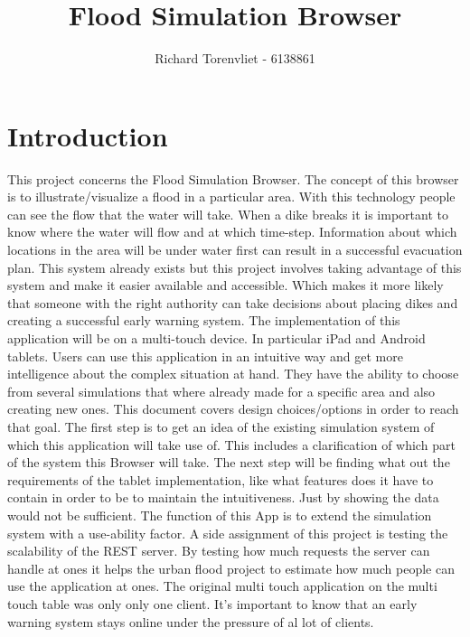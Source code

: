 \documentclass[10pt,a4paper]{article}
\author{Richard Torenvliet - 6138861}
\title{Flood Simulation Browser}
\begin{document}
\maketitle
\section{Introduction}
This project concerns the Flood Simulation Browser. The concept of this browser is to illustrate/visualize a flood in a particular area. With this technology people can see the flow that the water will take. When a dike breaks it is important to know where the water will flow and at which time-step. Information about which locations in the area will be under water first can result in a successful evacuation plan. This system already exists but this project involves taking advantage of this system and make it easier available and accessible. Which makes it more likely that someone with the right authority can take decisions about placing dikes and creating a successful early warning system.
The implementation of this application will be on a multi-touch device. In particular iPad and Android tablets. Users can use this application in an intuitive way and get more intelligence about the complex situation at hand. They have the ability to choose from several simulations that where already made for a specific area and also creating new ones.
This document covers design choices/options in order to reach that goal. The first step is to get an idea of the existing simulation system of which this application will take use of. This includes a clarification of which part of the system this Browser will take. The next step will be finding what out the requirements of the tablet implementation, like what features does it have to contain in order to be to maintain the intuitiveness. Just by showing the data would not be sufficient. The function of this App is to extend the simulation system with a use-ability factor.
A side assignment of this project is testing the scalability of the REST server. By testing how much requests the server can handle at ones it helps the urban flood project to estimate how much people can use the application at ones. The original multi touch application on the multi touch table was only only one client. It's important to know that an early warning system stays online under the pressure of al lot of clients.
\end{document}
